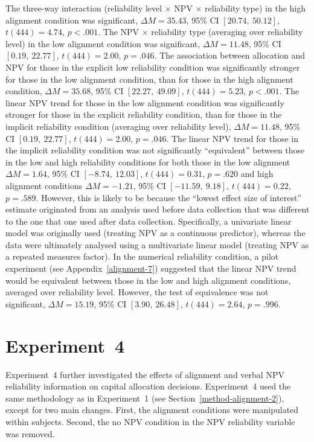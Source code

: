 \documentclass[a4paper, nobind]{templates/ociamthesis}
\theoremstyle{definition}
\theoremstyle{definition}
\theoremstyle{definition}
\theoremstyle{definition}
\theoremstyle{remark}
\begin{document}
The three-way interaction (reliability level \(\times\) NPV \(\times\) reliability
type) in the high alignment condition was significant,
\(\Delta M = 35.43\), 95\% CI \([20.74,~50.12]\), \(t(444) = 4.74\), \(p < .001\). The NPV \(\times\)
reliability type (averaging over reliability level) in the low alignment
condition was significant,
\(\Delta M = 11.48\), 95\% CI \([0.19,~22.77]\), \(t(444) = 2.00\), \(p = .046\). The association
between allocation and NPV for those in the explicit low reliability
condition was significantly stronger for those in the low alignment condition,
than for those in the high alignment condition,
\(\Delta M = 35.68\), 95\% CI \([22.27,~49.09]\), \(t(444) = 5.23\), \(p < .001\).
The linear NPV trend for those in the low alignment condition was
significantly stronger for those in the explicit reliability condition, than for
those in the implicit reliability condition (averaging over reliability level),
\(\Delta M = 11.48\), 95\% CI \([0.19,~22.77]\), \(t(444) = 2.00\), \(p = .046\). The linear
NPV trend for those in the implicit reliability condition was not
significantly ``equivalent'' between those in the low and high reliability
conditions for both those in the low alignment
\(\Delta M = 1.64\), 95\% CI \([-8.74,~12.03]\), \(t(444) = 0.31\), \(p = .620\)
and high alignment conditions
\(\Delta M = -1.21\), 95\% CI \([-11.59,~9.18]\), \(t(444) = 0.22\), \(p = .589\).
However, this is likely to be because the ``lowest effect size of interest''
estimate originated from an analysis used before data collection that was
different to the one that one used after data collection. Specifically, a
univariate linear model was originally used (treating NPV as a continuous
predictor), whereas the data were ultimately analysed using a multivariate
linear model (treating NPV as a repeated measures factor). In the numerical
reliability condition, a pilot experiment (see Appendix~\ref{alignment-7})
suggested that the linear NPV trend would be equivalent between those in the low
and high alignment conditions, averaged over reliability level. However, the
test of equivalence was not significant,
\(\Delta M = 15.19\), 95\% CI \([3.90,~26.48]\), \(t(444) = 2.64\), \(p = .996\).

\hypertarget{alignment-1}{%
\section{Experiment~4}\label{alignment-1}}

Experiment~4 further investigated the effects of alignment and verbal NPV
reliability information on capital allocation decisions. Experiment~4 used the
same methodology as in Experiment~1 (see Section~\ref{method-alignment-2}),
except for two main changes. First, the alignment conditions were manipulated
within subjects. Second, the no NPV condition in the NPV reliability variable
was removed.
\end{document}
